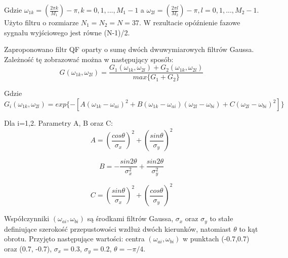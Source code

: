 \documentclass[10pt,a4paper]{article}
\begin{document}
Gdzie \begin{math}\omega_{1k}=(\frac{2\pi k}{M_1})-\pi, k=0,1,...,M_1-1\end{math} a \begin{math}\omega_{2l}=(\frac{2\pi l}{M_2})-\pi, l=0,1,...,M_2-1\end{math}. Użyto filtru o rozmiarze \begin{math}N_1=N_2=N=37\end{math}. W rezultacie opóźnienie fazowe sygnału wyjściowego jest równe (N-1)/2.

Zaproponowano filtr QF oparty o sumę dwóch dwuwymiarowych filtrów Gaussa. Zależność tę zobrazować można w następujący sposób:
\medskip
\begin{equation}
\label{QF4 - suma dwoch filtrow}
G(\omega_{1k},\omega_{2l})=\frac{G_1(\omega_{1k},\omega_{2l})+G_2(\omega_{1k},\omega_{2l})}{max\{G_1+G_2\}}
\end{equation}
\medskip

Gdzie
\medskip
\begin{equation}
\label{QF5 - Gi}
G_i(\omega_{1k},\omega_{2l})=exp\{-[A(\omega_{1k}-\omega_{ai})^2+B(\omega_{1k}-\omega_{ai})(\omega_{2l}-\omega_{bi})+C(\omega_{2l}-\omega_{bi})^2]\}
\end{equation}
\medskip

Dla i=1,2. Parametry A, B oraz C:
\medskip
\begin{equation}
\label{QF6  - A}
A=(\frac{cos\theta}{\sigma_x})^2+(\frac{sin\theta}{\sigma_y})^2
\end{equation}

\begin{equation}
\label{QF7  - B}
B=-\frac{sin2\theta}{\sigma_x^2}+\frac{sin2\theta}{\sigma_y^2}
\end{equation}

\begin{equation}
\label{QF8  - C}
C=(\frac{sin\theta}{\sigma_x})^2+(\frac{cos\theta}{\sigma_y})^2
\end{equation}
\medskip

Współczynniki \begin{math}(\omega_{ai},\omega_{bi})\end{math} są środkami filtrów Gaussa, \begin{math}\sigma_x \end{math} oraz \begin{math} \sigma_y \end{math} to stałe definiujące szerokość przepustowości wzdłuż dwóch kierunków, natomiast \begin{math}\theta\end{math} to kąt obrotu. Przyjęto następujące wartości: centra \begin{math}(\omega_{ai},\omega_{bi})\end{math} w punktach (-0.7,0.7) oraz (0.7, -0.7), \begin{math}\sigma_x = 0.3\end{math}, \begin{math}\sigma_y = 0.2\end{math}, \begin{math}\theta = -\pi / 4\end{math}.
\end{document}
